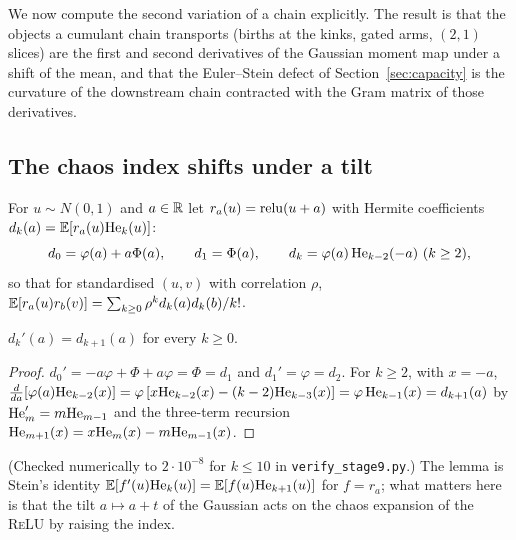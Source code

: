 \label{sec:births}
We now compute the second variation of a chain explicitly. The result is that the objects a cumulant chain
transports (births at the kinks, gated arms, $(2,1)$ slices) are the first and second derivatives of the Gaussian
moment map under a shift of the mean, and that the Euler--Stein defect of Section~\ref{sec:capacity} is the
curvature of the downstream chain contracted with the Gram matrix of those derivatives.

\subsection{The chaos index shifts under a tilt}
For $u\sim N(0,1)$ and $a\in\mathbb R$ let $r_a(u)=\operatorname{relu}(u+a)$ with Hermite coefficients $d_k(a)=\mathbb E[r_a(u)\mathrm{He}_k(u)]$:
\[
d_0=\varphi(a)+a\Phi(a),\qquad d_1=\Phi(a),\qquad d_k=\varphi(a)\,\mathrm{He}_{k-2}(-a)\ (k\ge2),
\]
so that for standardised $(u,v)$ with correlation $\rho$, $\mathbb E[r_a(u)r_b(v)]=\sum_{k\ge0}\rho^kd_k(a)d_k(b)/k!$.
\begin{lemma}\label{lem:shift}
$d_k'(a)=d_{k+1}(a)$ for every $k\ge0$.
\end{lemma}
\begin{proof}
$d_0'=-a\varphi+\Phi+a\varphi=\Phi=d_1$ and $d_1'=\varphi=d_2$. For $k\ge2$, with $x=-a$,
$\frac{d}{da}[\varphi(a)\mathrm{He}_{k-2}(x)]=\varphi\,[x\mathrm{He}_{k-2}(x)-(k-2)\mathrm{He}_{k-3}(x)]=\varphi\,\mathrm{He}_{k-1}(x)=d_{k+1}(a)$
by $\mathrm{He}_m'=m\mathrm{He}_{m-1}$ and the three-term recursion $\mathrm{He}_{m+1}(x)=x\mathrm{He}_m(x)-m\mathrm{He}_{m-1}(x)$.
\end{proof}
(Checked numerically to $2\cdot10^{-8}$ for $k\le10$ in \texttt{verify\_stage9.py}.) The lemma is Stein's identity
$\mathbb E[f'(u)\mathrm{He}_k(u)]=\mathbb E[f(u)\mathrm{He}_{k+1}(u)]$ for $f=r_a$; what matters here is that the tilt $a\mapsto a+t$ of the
Gaussian acts on the chaos expansion of the \textsc{ReLU} by raising the index.

